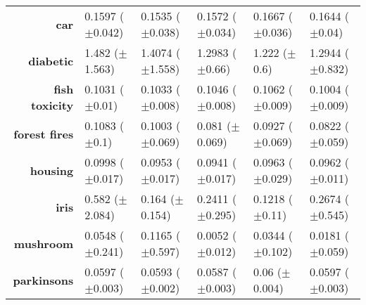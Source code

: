 \begin{table}[htbp]
{\begin{tabular}{r|lllll}
			\textbf{car}                 & \cellcolor[rgb]{ 1,  .922,  .518}0.1597 ($\pm$0.042)    & \cellcolor[rgb]{ .388,  .745,  .482}0.1535 ($\pm$0.038) & \cellcolor[rgb]{ .749,  .847,  .502}0.1572 ($\pm$0.034) & \cellcolor[rgb]{ .973,  .412,  .42}0.1667 ($\pm$0.036) & \cellcolor[rgb]{ .984,  .58,  .455}0.1644 ($\pm$0.04)   \\
			\textbf{diabetic}            & \cellcolor[rgb]{ .973,  .412,  .42}1.482 ($\pm$1.563)   & \cellcolor[rgb]{ .984,  .62,  .463}1.4074 ($\pm$1.558)  & \cellcolor[rgb]{ 1,  .922,  .518}1.2983 ($\pm$0.66)     & \cellcolor[rgb]{ .388,  .745,  .482}1.222 ($\pm$0.6)   & \cellcolor[rgb]{ .969,  .91,  .514}1.2944 ($\pm$0.832)  \\
			\textbf{fish toxicity}       & \cellcolor[rgb]{ .961,  .91,  .514}0.1031 ($\pm$0.01)   & \cellcolor[rgb]{ 1,  .922,  .518}0.1033 ($\pm$0.008)    & \cellcolor[rgb]{ .988,  .694,  .475}0.1046 ($\pm$0.008) & \cellcolor[rgb]{ .973,  .412,  .42}0.1062 ($\pm$0.009) & \cellcolor[rgb]{ .388,  .745,  .482}0.1004 ($\pm$0.009) \\
			\textbf{forest fires}        & \cellcolor[rgb]{ .973,  .412,  .42}0.1083 ($\pm$0.1)    & \cellcolor[rgb]{ .988,  .675,  .471}0.1003 ($\pm$0.069) & \cellcolor[rgb]{ .388,  .745,  .482}0.081 ($\pm$0.069)  & \cellcolor[rgb]{ 1,  .922,  .518}0.0927 ($\pm$0.069)   & \cellcolor[rgb]{ .451,  .761,  .482}0.0822 ($\pm$0.059) \\
			\textbf{housing}             & \cellcolor[rgb]{ .973,  .412,  .42}0.0998 ($\pm$0.017)  & \cellcolor[rgb]{ .745,  .847,  .502}0.0953 ($\pm$0.017) & \cellcolor[rgb]{ .388,  .745,  .482}0.0941 ($\pm$0.017) & \cellcolor[rgb]{ 1,  .918,  .518}0.0963 ($\pm$0.029)   & \cellcolor[rgb]{ 1,  .922,  .518}0.0962 ($\pm$0.011)    \\
			\textbf{iris}                & \cellcolor[rgb]{ .973,  .412,  .42}0.582 ($\pm$2.084)   & \cellcolor[rgb]{ .604,  .804,  .494}0.164 ($\pm$0.154)  & \cellcolor[rgb]{ 1,  .922,  .518}0.2411 ($\pm$0.295)    & \cellcolor[rgb]{ .388,  .745,  .482}0.1218 ($\pm$0.11) & \cellcolor[rgb]{ 1,  .882,  .514}0.2674 ($\pm$0.545)    \\
			\textbf{mushroom}            & \cellcolor[rgb]{ .996,  .796,  .494}0.0548 ($\pm$0.241) & \cellcolor[rgb]{ .973,  .412,  .42}0.1165 ($\pm$0.597)  & \cellcolor[rgb]{ .388,  .745,  .482}0.0052 ($\pm$0.012) & \cellcolor[rgb]{ 1,  .922,  .518}0.0344 ($\pm$0.102)   & \cellcolor[rgb]{ .655,  .82,  .494}0.0181 ($\pm$0.059)  \\
			\textbf{parkinsons}          & \cellcolor[rgb]{ 1,  .922,  .518}0.0597 ($\pm$0.003)    & \cellcolor[rgb]{ .769,  .855,  .502}0.0593 ($\pm$0.002) & \cellcolor[rgb]{ .388,  .745,  .482}0.0587 ($\pm$0.003) & \cellcolor[rgb]{ .973,  .412,  .42}0.06 ($\pm$0.004)   & \cellcolor[rgb]{ 1,  .918,  .518}0.0597 ($\pm$0.003)    \\

\end{tabular}}
\end{table}
